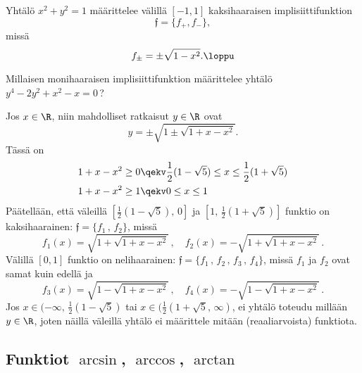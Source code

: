 \begin{Exa}
Yhtälö $x^2+y^2=1$ määrittelee välillä $[-1,1]$ kaksihaaraisen implisiittifunktion
\[
\mathfrak f=\{f_+,f_-\},
\]
missä
\[
f_\pm = \pm \sqrt{1-x^2}. \loppu
\]
\end{Exa}
\begin{Exa} Millaisen monihaaraisen implisiittifunktion määrittelee yhtälö \newline
$y^4-2y^2+x^2-x=0$\,?
\end{Exa}
\ratk Jos $x\in\R$, niin mahdolliset ratkaisut $y\in\R$ ovat
\[
y=\pm\sqrt{1\pm\sqrt{1+x-x^2}}.
\]
Tässä on
\begin{align*}
1+x-x^2 &\ge 0 \qekv \frac{1}{2}(1-\sqrt{5}) \le x \le \frac{1}{2}(1+\sqrt{5}) \\
1+x-x^2 &\ge 1 \qekv 0 \le x \le 1
\end{align*}
Päätellään, että väleillä $[\tfrac{1}{2}(1-\sqrt{5}),\,0]$ ja $[1,\,\tfrac{1}{2}(1+\sqrt{5})]$
funktio on kaksihaarainen: $\mathfrak{f}=\{f_1\,,\,f_2\}$, missä
\[
f_1(x)=\sqrt{1+\sqrt{1+x-x^2}}\,, \quad f_2(x)=-\sqrt{1+\sqrt{1+x-x^2}}\,.
\]
Välillä $[0,1]$ funktio on nelihaarainen: $\mathfrak{f}=\{f_1\,,\,f_2\,,\,f_3\,,\,f_4\}$,
missä $f_1$ ja $f_2$ ovat samat kuin edellä ja
\[
f_3(x)=\sqrt{1-\sqrt{1+x-x^2}}\,, \quad  f_4(x)=-\sqrt{1-\sqrt{1+x-x^2}}\,.
\]
Jos $x\in(-\infty,\,\tfrac{1}{2}(1-\sqrt{5})$ tai $x\in(\tfrac{1}{2}(1+\sqrt{5},\,\infty)$,
ei yhtälö toteudu millään $y\in\R$, joten näillä väleillä yhtälö ei määrittele mitään
(reaaliarvoista) funktiota. \loppu 

\subsection*{Funktiot $\arcsin$, $\arccos$, $\arctan$}

